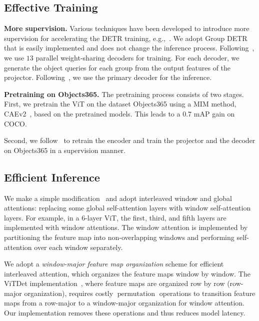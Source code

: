\documentclass[runningheads]{llncs}
\begin{document}
\subsection{Effective Training}
\noindent\textbf{More supervision.} Various techniques have been developed to introduce more supervision for accelerating the DETR training, e.g.,~\cite{chen2023group,jia2023detrs,zong2023detrs}.
We adopt Group DETR~\cite{chen2023group} that is easily implemented and 
does not change the inference process. Following~\cite{chen2023group}, we use $13$ parallel weight-sharing decoders for training. For each decoder, we generate the object queries for each group from the output features of the projector.
Following~\cite{chen2023group}, we use the primary decoder 
for the inference.

\vspace{1mm}
\noindent\textbf{Pretraining on Objects365.} The pretraining process consists of two stages. First, we pretrain the ViT on the dataset Objects365 using a MIM method, CAEv2~\cite{zhang2023cae}, based on the pretrained models. This leads to a $0.7$ mAP gain on COCO. 

Second, we follow~\cite{zhang2022dino,chen2022group} to retrain the encoder and train the projector and the decoder on Objects365
in a supervision manner. 

\subsection{Efficient Inference} \label{sec:efficient_inference}
We make a simple modification~\cite{li2021benchmarking,li2022exploring} and adopt interleaved window and global attentions: replacing some global self-attention layers with window self-attention layers. For example, in a $6$-layer ViT, the first, third, and fifth layers are implemented with window attentions. The window attention is implemented by partitioning the feature map into non-overlapping windows and performing self-attention over each window separately.

We adopt a {\em window-major feature map organization} scheme
for efficient interleaved attention, which organizes the feature maps window by window. The ViTDet implementation~\cite{li2022exploring}, where feature maps are organized row by row (row-major organization), requires costly $\operatorname{permutation}$ operations to transition feature maps from a row-major to a window-major organization for window attention. 
Our implementation removes these operations and thus reduces model latency.
\end{document}
